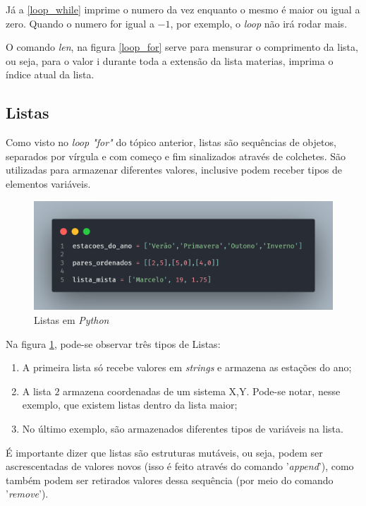 \documentclass[a4paper, 12pt]{article}
\begin{document}
Já a \ref{loop_while} imprime o numero da vez enquanto o mesmo é maior ou igual a zero. Quando o numero for igual a $-1$, por exemplo, o \textit{loop} não irá rodar mais.

O comando \textit{len}, na figura \ref{loop_for} serve para mensurar o comprimento da lista, ou seja, para o valor i durante toda a extensão da lista materias, imprima o índice atual da lista.

\subsection{Listas}
\label{Listas}
Como visto no \textit{loop "for"} do tópico anterior, listas são sequências de objetos, separados por vírgula e com começo e fim sinalizados através de colchetes. São utilizadas para armazenar diferentes valores, inclusive podem receber tipos de elementos variáveis.

\begin{figure}[ht]
    \centering
    \includegraphics[width = 12cm]{imagens/listas.png}
    \caption{Listas em \textit{Python}}
    \label{listas}
\end{figure}

Na figura \ref{listas}, pode-se observar três tipos de Listas:
\begin{enumerate}
    \item A primeira lista só recebe valores em \textit{strings} e armazena as estações do ano;
    \item A lista $2$ armazena coordenadas de um sistema X,Y. Pode-se notar, nesse exemplo, que existem listas dentro da lista maior;
    \item No último exemplo, são armazenados diferentes tipos de variáveis na lista.
\end{enumerate}

É importante dizer que listas são estruturas mutáveis, ou seja, podem ser ascrescentadas de valores novos (isso é feito através do comando '\textit{append}'), como também podem ser retirados valores dessa sequência (por meio do comando '\textit{remove}').
\end{document}
